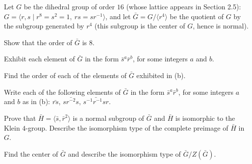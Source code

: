 \begin{exercise}\label{ex3.1.17}
    Let $G$ be the dihedral group of order $16$ (whose lattice appears in Section 2.5): $G = \langle r,s \mid r^8 = s^2 = 1,\ rs = sr^{-1} \rangle$, and let $\bar{G} = G/\langle r^4 \rangle$ be the quotient of $G$ by the subgroup generated by $r^4$ (this subgroup is the center of $G$, hence is normal).
    \begin{subproblems}
        \item Show that the order of $\bar{G}$ is $8$.
        \item Exhibit each element of $\bar{G}$ in the form $\bar{s}^a \bar{r}^b$, for some integers $a$ and $b$.
        \item Find the order of each of the elements of $\bar{G}$ exhibited in (b).
        \item Write each of the following elements of $\bar{G}$ in the form $\bar{s}^a \bar{r}^b$, for some integers $a$ and $b$ as in (b): $\bar{rs}$, $\bar{sr^{-2}s}$, $\bar{s^{-1}r^{-1}sr}$.
        \item Prove that $\bar{H} = \langle \bar{s}, \bar{r}^2 \rangle$ is a normal subgroup of $\bar{G}$ and $\bar{H}$ is isomorphic to the Klein $4$-group. Describe the isomorphism type of the complete preimage of $\bar{H}$ in $G$.
        \item Find the center of $\bar G$ and describe the isomorphism type of $\bar G/Z(\bar G)$.
    \end{subproblems}
\end{exercise}

